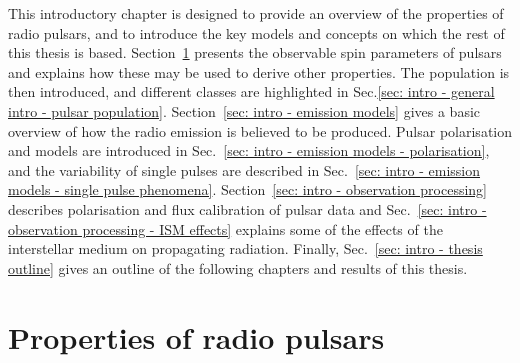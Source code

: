 This introductory chapter is designed to provide an overview of the properties of radio pulsars, and to introduce the key models and concepts on which the rest of this thesis is based. Section~\ref{sec: intro - general intro} presents the observable spin parameters of pulsars and explains how these may be used to derive other properties. The population is then introduced, and different classes are highlighted in Sec.\ref{sec: intro - general intro - pulsar population}. Section~\ref{sec: intro - emission models} gives a basic overview of how the radio emission is believed to be produced. Pulsar polarisation and models are introduced in Sec.~\ref{sec: intro - emission models - polarisation}, and the variability of single pulses are described in Sec.~\ref{sec: intro - emission models - single pulse phenomena}. Section~\ref{sec: intro - observation processing} describes polarisation and flux calibration of pulsar data and Sec.~\ref{sec: intro - observation processing - ISM effects} explains some of the effects of the interstellar medium on propagating radiation. Finally, Sec.~\ref{sec: intro - thesis outline} gives an outline of the following chapters and results of this thesis.












\section{Properties of radio pulsars}
\label{sec: intro - general intro}

